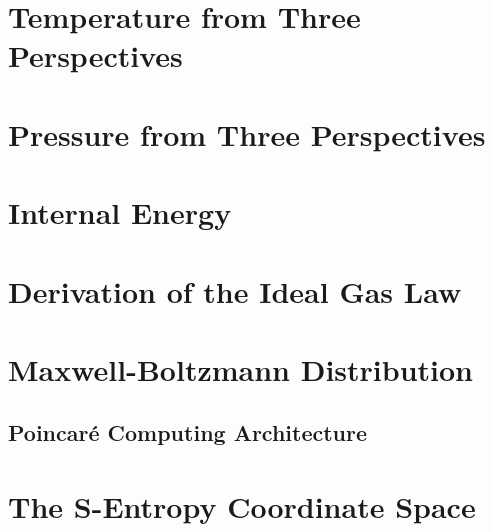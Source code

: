 \section{Temperature from Three Perspectives}
\label{sec:temperature}



\section{Pressure from Three Perspectives}
\label{sec:pressure}



\section{Internal Energy}
\label{sec:internal_energy}



\section{Derivation of the Ideal Gas Law}
\label{sec:ideal_gas_law}



\section{Maxwell-Boltzmann Distribution}
\label{sec:maxwell}




\subsection{Poincar\'e Computing Architecture}
\label{part:computing}

\section{The S-Entropy Coordinate Space}
\label{sec:finite_space}

